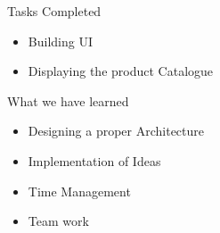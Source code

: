 \documentclass[14pt]{beamer}
\begin{document}
\begin{frame}{Tasks Completed}
 \begin{itemize}
  \item {
    Building UI
  }
  \item {
    Displaying the product Catalogue
  }
  \end{itemize}
\end{frame}


\begin{frame}{What we have learned}
    \begin{itemize}
        \item{Designing a proper Architecture}
        \item{Implementation of Ideas }
        \item{Time Management}
        \item{Team work}
    \end{itemize}
\end{frame}
\end{document}
